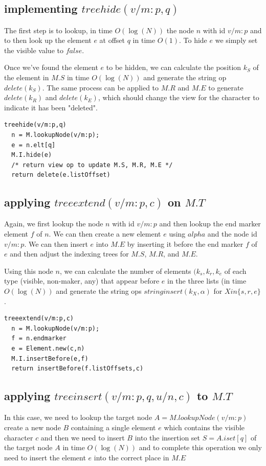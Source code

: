 \documentclass{amsart}
\begin{document}
\subsection{implementing $treehide(v/m:p,q)$}
The first step is to lookup, in time $O(\log(N))$ the node $n$ with id $v/m:p$
and to then look up the element $e$ at offset $q$ in time $O(1)$. 
To hide $e$ we simply set the visible value to $false$.

Once we've found the element $e$ to be hidden, we can
calculate the position $k_S$ of the element in $M.S$ in time $O(\log(N))$
and generate the string op $delete(k_S)$. The same process can be applied to
$M.R$ and $M.E$ to generate $delete(k_R)$ and $delete(k_E)$, which should
change the view for the character to indicate it has been "deleted".

\begin{verbatim}
treehide(v/m:p,q)
  n = M.lookupNode(v/m:p);
  e = n.elt[q]
  M.I.hide(e)
  /* return view op to update M.S, M.R, M.E */
  return delete(e.listOffset)
\end{verbatim}


\subsection{applying $treeextend(v/m:p,c)$ on $M.T$}
Again, we first lookup the node $n$ with id $v/m:p$ and then lookup the 
end marker element $f$ of $n$. We can then create a new element $e$
using $alpha$ and the node id $v/m:p$. We can then insert $e$ into
$M.E$ by inserting it before the end marker $f$ of $e$ and then adjust 
the indexing trees for $M.S$, $M.R$, and $M.E$.

Using this node $n$, we can calculate the number
of elements $(k_s,k_r,k_e$ of each type (visible, non-maker, any) that appear before $e$ in
the three lists (in time $O(\log(N))$ and generate the string ops $stringinsert(k_X,\alpha)$ for $X in \{s,r,e\}$.

\begin{verbatim}
treeextend(v/m:p,c)
  n = M.lookupNode(v/m:p);
  f = n.endmarker
  e = Element.new(c,n)
  M.I.insertBefore(e,f)
  return insertBefore(f.listOffsets,c)
\end{verbatim}

\subsection{applying $treeinsert(v/m:p,q,u/n,c)$ to $M.T$}
In this case, we need to lookup the target node $A = M.lookupNode(v/m:p)$ create a new node $B$ containing a single element
$e$ which contains the visible character $c$ and then we need to insert $B$
into the insertion set $S=A.iset[q]$ of the target node $A$ in time $O(\log(N))$ 
and to complete this operation we only need to insert the element $e$ into the correct place in $M.E$
\end{document}
